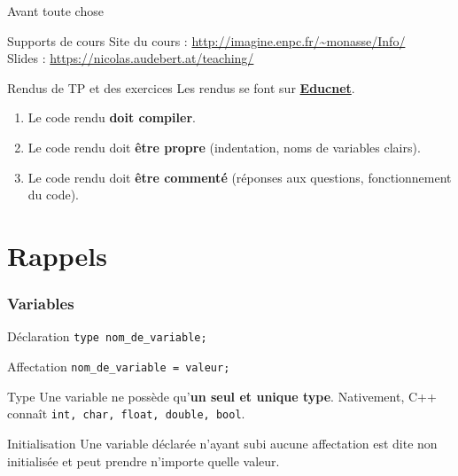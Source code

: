 
\subtitle{Les tableaux statiques}
\date[29 sep. 2017]{Vendredi 29 septembre 2017}
\maketitle

\begin{frame}{Avant toute chose}
  \begin{block}{Supports de cours}
    Site du cours : {\small \url{http://imagine.enpc.fr/~monasse/Info/}}\\
  	Slides : {\small \url{https://nicolas.audebert.at/teaching/}}
  \end{block}

  \begin{alertblock}{Rendus de TP et des exercices}
  Les rendus se font sur \href{https://educnet.enpc.fr}{\textbf{Educnet}}.
  \begin{enumerate}
  	\item Le code rendu \textbf{doit compiler}.
    \item Le code rendu doit \textbf{être propre} (indentation, noms de variables clairs).
    \item Le code rendu doit \textbf{être commenté} (réponses aux questions, fonctionnement du code).
  \end{enumerate}
  \end{alertblock}

\end{frame}

\section{Rappels}

\begin{frame}
	\frametitle{Variables}
    \begin{block}{Déclaration}
    \texttt{type nom_de_variable;}
    \end{block}
    
    \begin{block}{Affectation}
    \texttt{nom_de_variable = valeur;}
    \end{block}
    
    \begin{alertblock}{Type}
    Une variable ne possède qu'\textbf{un seul et unique type}. Nativement, C++ connaît \texttt{int, char, float, double, bool}.
    \end{alertblock}
    
    \begin{alertblock}{Initialisation}
    Une variable déclarée n'ayant subi aucune affectation est dite non initialisée et peut prendre n'importe quelle valeur.
    \end{alertblock}
\end{frame}

